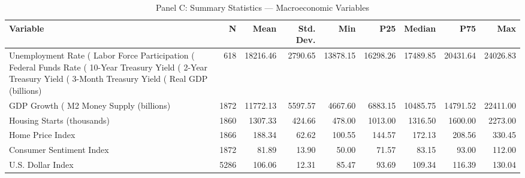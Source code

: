 \begin{table}
\caption{Panel C: Summary Statistics — Macroeconomic Variables}
\label{tab:panel_c_macro}
\begin{tabular}{lrrrrrrrr}
\hline\hline
Variable & N & Mean & Std. Dev. & Min & P25 & Median & P75 & Max \\
\hline
Unemployment Rate (%
Labor Force Participation (%
Federal Funds Rate (%
10-Year Treasury Yield (%
2-Year Treasury Yield (%
3-Month Treasury Yield (%
Real GDP (billions) & 618 & 18216.46 & 2790.65 & 13878.15 & 16298.26 & 17489.85 & 20431.64 & 24026.83 \\
GDP Growth (%
M2 Money Supply (billions) & 1872 & 11772.13 & 5597.57 & 4667.60 & 6883.15 & 10485.75 & 14791.52 & 22411.00 \\
Housing Starts (thousands) & 1860 & 1307.33 & 424.66 & 478.00 & 1013.00 & 1316.50 & 1600.00 & 2273.00 \\
Home Price Index & 1866 & 188.34 & 62.62 & 100.55 & 144.57 & 172.13 & 208.56 & 330.45 \\
Consumer Sentiment Index & 1872 & 81.89 & 13.90 & 50.00 & 71.57 & 83.15 & 93.00 & 112.00 \\
U.S. Dollar Index & 5286 & 106.06 & 12.31 & 85.47 & 93.69 & 109.34 & 116.39 & 130.04 \\
\hline\hline
\end{tabular}
\end{table}
